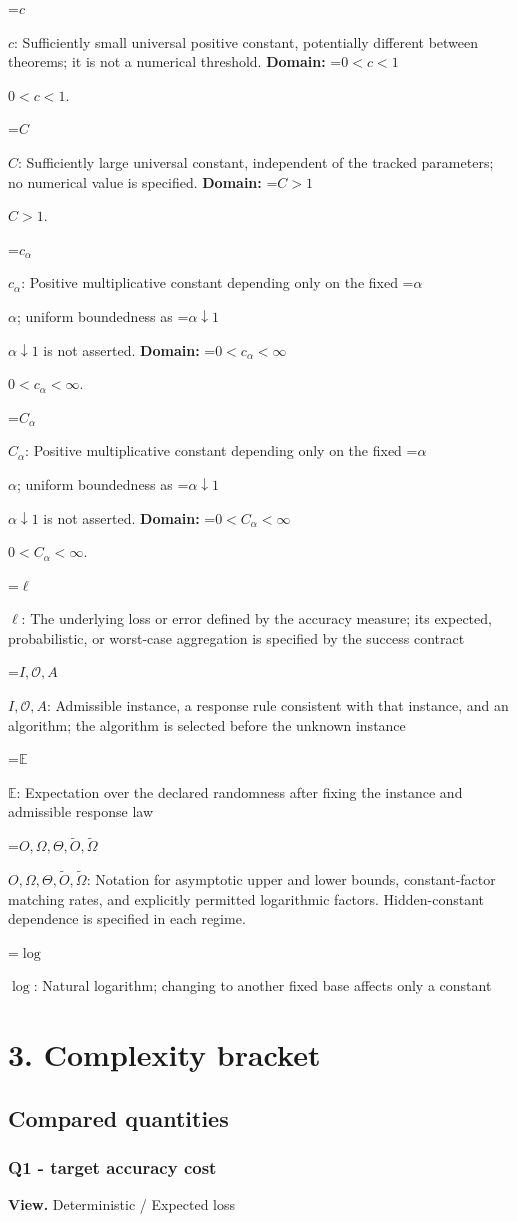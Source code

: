 \documentclass[10pt,a4paper]{article}
\newcommand{\AtlasMath}[1]{\par\begingroup\centering\setbox0=\hbox{$\displaystyle #1$}\ifdim\wd0>1.4\linewidth\typeout{ATLAS WIDE FORMULA: \the\wd0}\fi\ifdim\wd0>\linewidth\resizebox{\linewidth}{!}{\box0}\else\box0\fi\par\endgroup}
\newcommand{\AtlasInlineMath}[1]{\begingroup\setbox0=\hbox{$#1$}\ifdim\wd0>.4\linewidth\endgroup\AtlasMath{#1}\else\endgroup$#1$\fi}
\begin{document}
\AtlasInlineMath{c}: Sufficiently small universal positive constant, potentially different between theorems; it is not a numerical threshold. \textbf{Domain:} \AtlasInlineMath{0<c<1}.

\AtlasInlineMath{C}: Sufficiently large universal constant, independent of the tracked parameters; no numerical value is specified. \textbf{Domain:} \AtlasInlineMath{C>1}.

\AtlasInlineMath{c_\alpha}: Positive multiplicative constant depending only on the fixed \AtlasInlineMath{\alpha}; uniform boundedness as \AtlasInlineMath{\alpha\downarrow1} is not asserted. \textbf{Domain:} \AtlasInlineMath{0<c_\alpha<\infty}.

\AtlasInlineMath{C_\alpha}: Positive multiplicative constant depending only on the fixed \AtlasInlineMath{\alpha}; uniform boundedness as \AtlasInlineMath{\alpha\downarrow1} is not asserted. \textbf{Domain:} \AtlasInlineMath{0<C_\alpha<\infty}.

\AtlasInlineMath{\ell}: The underlying loss or error defined by the accuracy measure; its expected, probabilistic, or worst-case aggregation is specified by the success contract

\AtlasInlineMath{I,\mathcal{O},A}: Admissible instance, a response rule consistent with that instance, and an algorithm; the algorithm is selected before the unknown instance

\AtlasInlineMath{\mathbb{E}}: Expectation over the declared randomness after fixing the instance and admissible response law

\AtlasInlineMath{O,\Omega,\Theta,\widetilde{O},\widetilde\Omega}: Notation for asymptotic upper and lower bounds, constant-factor matching rates, and explicitly permitted logarithmic factors. Hidden-constant dependence is specified in each regime.

\AtlasInlineMath{\log}: Natural logarithm; changing to another fixed base affects only a constant

\section{3. Complexity bracket}
\subsection{Compared quantities}
\subsubsection{Q1 - target accuracy cost}
\textbf{View.} Deterministic / Expected loss
\end{document}
